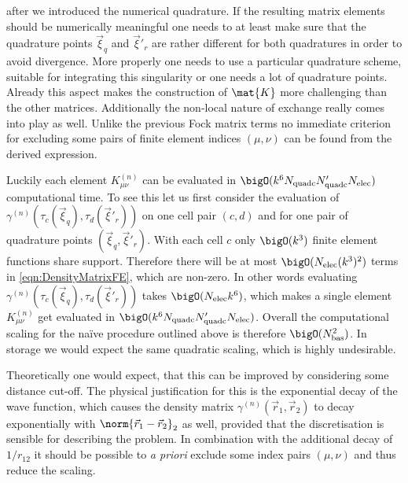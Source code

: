after we introduced the numerical quadrature.
If the resulting matrix elements should be numerically meaningful
one needs to at least make sure that the quadrature
points $\vec{\xi}_q$ and $\vec{\xi}'_r$ are rather different for both
quadratures in order to avoid divergence.
More properly one needs to use a particular quadrature scheme,
suitable for integrating this singularity
or one needs a lot of quadrature points.
Already this aspect makes the construction of $\mat{K}$ more challenging
than the other matrices.
Additionally the non-local nature of \HF exchange really comes
into play as well.
Unlike the previous Fock matrix terms
no immediate criterion for excluding some
pairs of finite element indices $(\mu, \nu)$ can be found
from the derived expression.

Luckily each element $K^{(n)}_{\mu\nu}$
can be evaluated in $\bigO(k^6 \Nquadc \Nquadc' \Nelec)$
computational time.
To see this let us first consider the evaluation of
$\gamma^{(n)}\!\left(\tau_c(\vec{\xi}_q), \tau_d(\vec{\xi}'_r)\right)$
on one cell pair $(c,d)$ and for one pair
of quadrature points $(\vec{\xi}_q, \vec{\xi}'_r)$.
With each cell $c$ only $\bigO(k^3)$ finite element functions share support.
Therefore
there will be at most $\bigO(\Nelec (k^3)^2)$
terms in \eqref{eqn:DensityMatrixFE}, which are non-zero.
In other words evaluating
$\gamma^{(n)}\!\left(\tau_c(\vec{\xi}_q), \tau_d(\vec{\xi}'_r)\right)$
takes $\bigO(\Nelec k^6)$,
which makes a single element $K^{(n)}_{\mu\nu}$ get evaluated
in $\bigO(k^6 \Nquadc \Nquadc' \Nelec)$.
Overall the computational scaling for the na\"{i}ve
procedure outlined above is therefore $\bigO(\Nbas^2)$.
In storage we would expect the same quadratic scaling,
which is highly undesirable.

Theoretically one would expect,
that this can be improved by considering some distance cut-off.
The physical justification for this is the exponential decay of the wave function,
which causes the density matrix $\gamma^{(n)}(\vec{r}_1, \vec{r}_2)$
to decay exponentially with $\norm{\vec{r}_1 - \vec{r}_2}_2$
as well,
provided that the discretisation is sensible for describing the problem.
In combination with the additional decay of $1/r_{12}$
it should be possible to \textit{a priori} exclude some index pairs $(\mu, \nu)$
and thus reduce the scaling.

